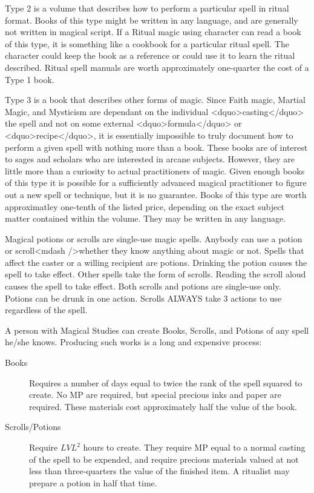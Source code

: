 Type 2 is a volume that describes how to perform a particular spell in
ritual format.  Books of this type might be written in any language,
and are generally not written in magical script.  If a Ritual magic
using character can read a book of this type, it is something like a
cookbook for a particular ritual spell.  The character could keep the
book as a reference or could use it to learn the ritual described.
Ritual spell manuals are worth approximately one-quarter the cost of a
Type 1 book.

Type 3 is a book that describes other forms of magic.  Since Faith
magic, Martial Magic, and Mysticism are dependant on the individual
<dquo>casting</dquo> the spell and not on some external <dquo>formula</dquo> or
<dquo>recipe</dquo>, it is essentially impossible to truly document how to
perform a given spell with nothing more than a book.  These books are
of interest to sages and scholars who are interested in arcane
subjects.  However, they are little more than a curiosity to actual
practitioners of magic.  Given enough books of this type it is
possible for a sufficiently advanced magical practitioner to figure
out a new spell or technique, but it is no guarantee.  Books of this
type are worth approximatley one-tenth of the listed price, depending
on the exact subject matter contained within the volume.  They may be
written in any language.

Magical potions or scrolls are single-use magic spells.  Anybody can
use a potion or scroll<mdash />whether they know anything about magic or
not.  Spells that affect the caster or a willing recipient are
potions.  Drinking the potion causes the spell to take effect.  Other
spells take the form of scrolls.  Reading the scroll aloud causes the
spell to take effect.  Both scrolls and potions are single-use only.
Potions can be drunk in one action.  Scrolls ALWAYS take 3 actions to
use regardless of the spell.

A person with Magical Studies can create Books, Scrolls, and Potions
of any spell he/she knows.  Producing such works is a long and
expensive process:

\begin{description}
\item[Books] Requires a number of days equal to twice the rank of the
  spell squared to create.  No MP are required, but special precious
  inks and paper are required.  These materials cost approximately
  half the value of the book.

\item[Scrolls/Potions] Require $LVL^2$ hours to create.  They require
  MP equal to a normal casting of the spell to be expended, and
  require precious materials valued at not less than three-quarters
  the value of the finished item.  A ritualist may prepare a potion in
  half that time.
\end{description}

